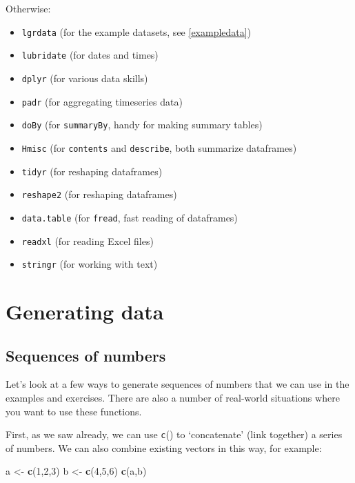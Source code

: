\documentclass[]{book}
\newenvironment{Shaded}{\begin{snugshade}}{\end{snugshade}}
\newcommand{\DecValTok}[1]{\textcolor[rgb]{0.00,0.00,0.81}{#1}}
\newcommand{\KeywordTok}[1]{\textcolor[rgb]{0.13,0.29,0.53}{\textbf{#1}}}
\newcommand{\NormalTok}[1]{#1}
\newcommand{\StringTok}[1]{\textcolor[rgb]{0.31,0.60,0.02}{#1}}
\providecommand{\tightlist}{%
  \setlength{\itemsep}{0pt}\setlength{\parskip}{0pt}}
\begin{document}
Otherwise:

\begin{itemize}
\tightlist
\item
  \texttt{lgrdata} (for the example datasets, see \ref{exampledata})
\item
  \texttt{lubridate} (for dates and times)
\item
  \texttt{dplyr} (for various data skills)
\item
  \texttt{padr} (for aggregating timeseries data)
\item
  \texttt{doBy} (for \texttt{summaryBy}, handy for making summary tables)
\item
  \texttt{Hmisc} (for \texttt{contents} and \texttt{describe}, both summarize dataframes)
\item
  \texttt{tidyr} (for reshaping dataframes)
\item
  \texttt{reshape2} (for reshaping dataframes)
\item
  \texttt{data.table} (for \texttt{fread}, fast reading of dataframes)
\item
  \texttt{readxl} (for reading Excel files)
\item
  \texttt{stringr} (for working with text)
\end{itemize}

\hypertarget{generating-data}{%
\section{Generating data}\label{generating-data}}

\hypertarget{sequences}{%
\subsection{Sequences of numbers}\label{sequences}}

Let's look at a few ways to generate sequences of numbers that we can use in the examples and exercises. There are also a number of real-world situations where you want to use these functions.

First, as we saw already, we can use \texttt{c}() to `concatenate' (link together) a series of numbers. We can also combine existing vectors in this way, for example:

\begin{Shaded}
\begin{Highlighting}[]
\NormalTok{a <-}\StringTok{ }\KeywordTok{c}\NormalTok{(}\DecValTok{1}\NormalTok{,}\DecValTok{2}\NormalTok{,}\DecValTok{3}\NormalTok{)}
\NormalTok{b <-}\StringTok{ }\KeywordTok{c}\NormalTok{(}\DecValTok{4}\NormalTok{,}\DecValTok{5}\NormalTok{,}\DecValTok{6}\NormalTok{)}
\KeywordTok{c}\NormalTok{(a,b)}
\end{Highlighting}
\end{Shaded}
\end{document}
